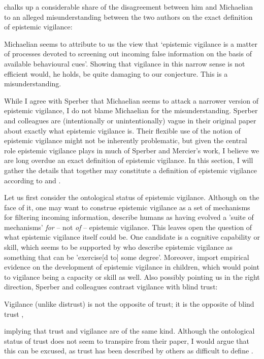 \citet{Sperber13} chalks up a considerable share of the disagreement between him and Michaelian to an alleged misunderstanding between the two authors on the exact definition of epistemic vigilance:
\begin{quoting}
    Michaelian seems to attribute to us the view that ‘epistemic vigilance is a matter of processes devoted to screening out incoming false information on the basis of available behavioural cues’. Showing that vigilance in this narrow sense is not efficient would, he holds, be quite damaging to our conjecture. This is a misunderstanding.
    \hfill \citep[p.~65]{Sperber13}
\end{quoting}
While I agree with Sperber that Michaelian seems to attack a narrower version of epistemic vigilance, I do not blame Michaelian for the misunderstanding. Sperber and colleagues are (intentionally or unintentionally) vague in their original paper about exactly what epistemic vigilance is.
Their flexible use of the notion of epistemic vigilance might not be inherently problematic, but given the central role epistemic vigilance plays in much of Sperber and Mercier's work, I believe we are long overdue an exact definition of epistemic vigilance. In this section, I will gather the details that together may constitute a definition of epistemic vigilance according to \citet{Sperber10} and \citet{Sperber13}.

Let us first consider the ontological status of epistemic vigilance. Although on the face of it, one may want to construe epistemic vigilance as a set of mechanisms for filtering incoming information, \citet{Sperber10} describe humans as having evolved a 'suite of mechanisms' \emph{for} -- not \emph{of} -- epistemic vigilance. This leaves open the question of what epistemic vigilance itself could be. One candidate is a cognitive capability or skill, which seems to be supported by \citet[p.~60]{MS11} who describe epistemic vigilance as something that can be 'exercise[d to] some degree'. Moreover, \citet[\S 5]{Sperber10} import empirical evidence on the development of epistemic vigilance in children, which would point to vigilance being a capacity or skill as well.
Also possibly pointing us in the right direction, Sperber and colleagues contrast vigilance with blind trust:
\begin{quoting}
    Vigilance (unlike distrust) is not the opposite of trust; it is the opposite
of blind trust
    \hfill \citep[p.~363]{Sperber10},
\end{quoting}
implying that trust and vigilance are of the same kind. Although the ontological status of trust does not seem to transpire from their \citeyear{Sperber10} paper, I would argue that this can be excused, as trust has been described by others as difficult to define \citep{Simpson12,McKnight00}.

